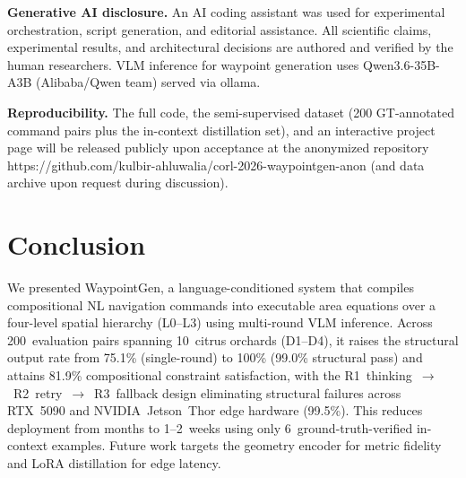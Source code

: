 \documentclass{article}
\begin{document}
\textbf{Generative AI disclosure.}
An AI coding assistant was used for experimental orchestration, script generation, and editorial assistance. All scientific claims, experimental results, and architectural decisions are authored and verified by the human researchers. VLM inference for waypoint generation uses Qwen3.6-35B-A3B (Alibaba/Qwen team) served via ollama.

\textbf{Reproducibility.}
The full code, the semi-supervised dataset (200 GT-annotated command pairs plus the in-context distillation set), and an interactive project page will be released publicly upon acceptance at the anonymized repository https://github.com/kulbir-ahluwalia/corl-2026-waypointgen-anon (and data archive upon request during discussion).

\section{Conclusion}
\label{sec:conclusions}


We presented WaypointGen, a language-conditioned system that compiles compositional NL navigation commands into executable area equations over a four-level spatial hierarchy (L0--L3) using multi-round VLM inference. Across 200~evaluation pairs spanning 10~citrus orchards (D1--D4), it raises the structural output rate from 75.1\% (single-round) to 100\% (99.0\% structural pass) and attains 81.9\% compositional constraint satisfaction, with the R1~thinking~$\to$~R2~retry~$\to$~R3~fallback design eliminating structural failures across RTX~5090 and NVIDIA~Jetson~Thor edge hardware (99.5\%). This reduces deployment from months to 1--2~weeks using only 6~ground-truth-verified in-context examples. Future work targets the geometry encoder for metric fidelity and LoRA distillation for edge latency.









\end{document}
